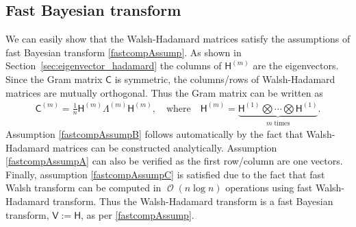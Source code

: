 \documentclass{svjour3}                     %
\DeclareMathOperator{\Order}{{\mathcal O}}
\newcommand{\mSigma}{\mathsf{\Sigma}}
\newcommand{\mB}{\mathsf{B}}
\newcommand{\mA}{\mathsf{A}}
\newcommand{\mC}{\mathsf{C}}
\newcommand{\mLambda}{\mathsf{\Lambda}}
\newcommand{\mH}{\mathsf{H}}
\newcommand{\mV}{\mathsf{V}}
\newcommand{\JRNote}[1]{{\textcolor{green}{JR: #1}}}
\begin{document}

\subsection{Fast Bayesian transform}
We can easily show that the Walsh-Hadamard matrices satisfy the assumptions of fast Bayesian transform \eqref{fastcompAssump}. As shown in Section~\ref{sec:eigenvector_hadamard} the columns of $\mH^{({m})}$ are the eigenvectors. Since the Gram matrix $\mC$ is symmetric, the columns/rows of Walsh-Hadamard matrices are mutually orthogonal. Thus the Gram matrix can be written as 
\begin{align}
\label{eqn:hadamard_fwht}
\mC^{(m)} = \frac{1}{n} \mH^{(m)} \mLambda^{(m)} \mH^{(m)}, \quad \text{where} \quad \mH^{({m})} = \underbrace{ \mH^{(1)} \bigotimes \cdots \bigotimes \mH^{(1)} }_{m \; \text{times}}.
\end{align}
Assumption \eqref{fastcompAssumpB} follows automatically by the fact that Walsh-Hadamard matrices can be constructed analytically. Assumption \eqref{fastcompAssumpA} can also be verified as the first row/column are one vectors. Finally, assumption \eqref{fastcompAssumpC} is satisfied due to the fact that fast Walsh transform can be computed in $\Order({n \log n})$ operations using fast Walsh-Hadamard transform.
Thus the Walsh-Hadamard transform is a fast Bayesian transform, $\mV := \mH$, as per \eqref{fastcompAssump}.
\end{document}
